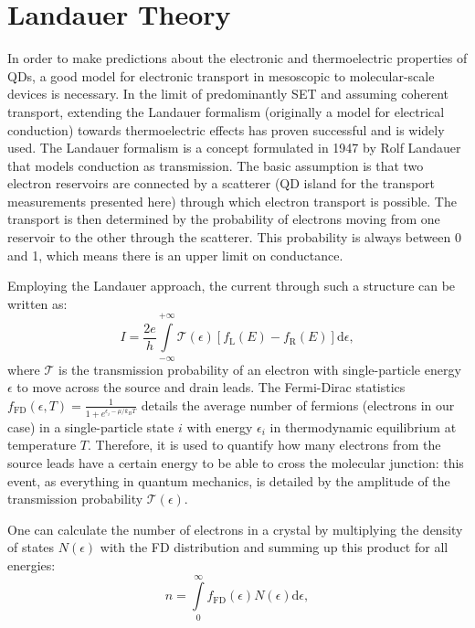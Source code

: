 \section{Landauer Theory}\label{ch:theory:sec:landauer_theory}
In order to make predictions about the electronic and thermoelectric properties of QDs, a good model for electronic transport in mesoscopic to molecular-scale devices is necessary. In the limit of predominantly SET and assuming coherent transport, extending the Landauer formalism (originally a model for electrical conduction) towards thermoelectric effects has proven successful and is widely used. The Landauer formalism is a concept formulated in 1947 by Rolf Landauer that models conduction as transmission. The basic assumption is that two electron reservoirs are connected by a scatterer (QD island for the transport measurements presented here) through which electron transport is possible. The transport is then determined by the probability of electrons moving from one reservoir to the other
through the scatterer. This probability is always between 0 and 1, which means there
is an upper limit on conductance.

Employing the Landauer approach, the current through such a structure can be
written as:
\begin{equation}
    I = \frac{2e}{h} \int\limits_{-\infty}^{+\infty}\mathcal{T}(\epsilon)[f_\textrm{L}(E) - f_\textrm{R}(E)]\text{d}\epsilon,
\end{equation}
where $\mathcal{T}$ is the transmission probability of an electron with single-particle energy $\epsilon$ to move across the source and drain leads. The Fermi-Dirac statistics
$f_\textrm{FD}(\epsilon, T) = \frac{1}{1+e^{\epsilon_i - \mu/k_BT}} $ details the average number of fermions (electrons in our case) in a single-particle state $i$ with energy $\epsilon_i$ in thermodynamic equilibrium at temperature $T$. Therefore, it is used to quantify how many electrons from the source leads have a certain energy to be able to cross the molecular junction: this event, as everything in quantum mechanics, is detailed by the amplitude of the transmission probability $\mathcal{T}(\epsilon)$.

One can calculate the number of electrons in a crystal by multiplying the density of
states $N(\epsilon)$ with the FD distribution and summing up this product for all energies:
\begin{equation}
    n = \int\limits_0^{\infty}f_\textrm{FD}(\epsilon)N(\epsilon)\text{d}\epsilon,
\end{equation}

